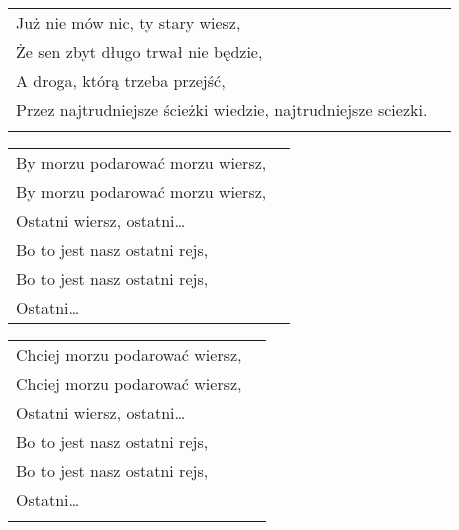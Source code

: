 \documentclass[a5paper]{article}
\begin{document}
\noindent
\begin{tabular}{@{}p{8.00cm}p{3cm}@{}}
Już nie mów nic, ty stary wiesz, \\
Że sen zbyt długo trwał nie będzie,	\\
A droga, którą trzeba przejść, \\
Przez najtrudniejsze ścieżki wiedzie, najtrudniejsze sciezki.\\ \\
\end{tabular}

\noindent
\begin{tabular}{@{}p{8.00cm}p{3cm}@{}}
By morzu podarować morzu wiersz, \\
By morzu podarować morzu wiersz, \\
Ostatni wiersz, ostatni… \\
Bo to jest nasz ostatni rejs, \\
Bo to jest nasz ostatni rejs, \\
Ostatni…
\end{tabular}
\noindent
\begin{tabular}{@{}p{8.00cm}p{3cm}@{}}
Chciej morzu podarować wiersz, \\
Chciej morzu podarować wiersz, \\
Ostatni wiersz, ostatni… \\
Bo to jest nasz ostatni rejs, \\
Bo to jest nasz ostatni rejs, \\
Ostatni… \\ \\
\end{tabular}
\end{document}
